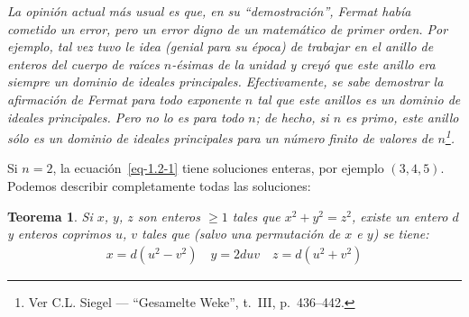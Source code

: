 \documentclass[oneside,bibtotoc,leqno,spanish]{amsbook}
\numberwithin{equation}{section}
\newenvironment{comm}%
	{\begin{trivlist}\item\small\itshape}
	{\end{trivlist}}
\theoremstyle{defi}
\theoremstyle{note}
\newtheorem{theorem}{Teorema}
\theoremstyle{rem}
\numberwithin{theorem}{section}
\numberwithin{proposition}{section}
\numberwithin{definition}{section}
\numberwithin{lemma}{section}
\numberwithin{corollary}{section}
\numberwithin{example}{section}
\numberwithin{footnote}{section}%
\begin{document}
\begin{comm}
La opini\'on actual m\'as usual es que, en su ``demostraci\'on'', Fermat hab\'ia cometido
un error, pero un error digno de un matem\'atico de primer orden. Por ejemplo, tal vez
tuvo le idea (genial para su \'epoca) de trabajar en el anillo de enteros del cuerpo de
ra\'ices $n$-\'esimas de la unidad y crey\'o que este anillo era siempre un dominio de ideales
principales. Efectivamente, se sabe demostrar la afirmaci\'on de Fermat para todo exponente $n$
tal que este anillos es un dominio de ideales principales. Pero no lo es para todo $n$;
de hecho,
si $n$ es primo, este anillo s\'olo es un dominio de ideales principales para un n\'umero
finito de valores de $n$\footnote{Ver C.L. Siegel --- ``Gesamelte Weke'', t.~III, p.~436--442.}.
\end{comm}

Si $n=2$, la ecuaci\'on~\eqref{eq-1.2-1} tiene soluciones enteras, por
ejemplo $(3,4,5)$. Podemos describir completamente todas las soluciones:

\begin{theorem}\label{teo1.2.1}
Si $x$, $y$, $z$ son enteros $\geq 1$ tales que $x^{2}+y^{2}=z^{2}$, existe un entero
$d$ y enteros coprimos $u$, $v$ tales que (salvo una permutaci\'on de $x$ e $y$) se tiene:
\begin{gather}\label{eq-1.2-2}
x = d(u^{2}-v^{2})\quad y = 2duv\quad z = d(u^{2}+v^{2})
\end{gather}
\end{theorem}
\end{document}
